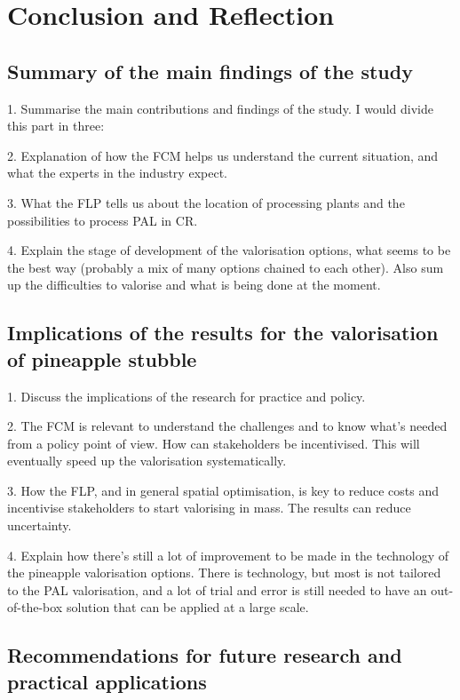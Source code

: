 \chapter{Conclusion and Reflection}
\label{concludeGen}

\section{Summary of the main findings of the study}

1. Summarise the main contributions and findings of the study. I would divide this part in three:

2. Explanation of how the FCM helps us understand the current situation, and what the experts in the industry expect. 

3. What the FLP tells us about the location of processing plants and the possibilities to process PAL in CR. 

4. Explain the stage of development of the valorisation options, what seems to be the best way (probably a mix of many options chained to each other). Also sum up the difficulties to valorise and what is being done at the moment. 

\section{Implications of the results for the valorisation of pineapple stubble}

1. Discuss the implications of the research for practice and policy. 

2. The FCM is relevant to understand the challenges and to know what's needed from a policy point of view. How can stakeholders be incentivised. This will eventually speed up the valorisation systematically.

3. How the FLP, and in general spatial optimisation, is key to reduce costs and incentivise stakeholders to start valorising in mass. The results can reduce uncertainty. 

4. Explain how there's still a lot of improvement to be made in the technology of the pineapple valorisation options. There is technology, but most is not tailored to the PAL valorisation, and a lot of trial and error is still needed to have an out-of-the-box solution that can be applied at a large scale. 

\section{Recommendations for future research and practical applications}

